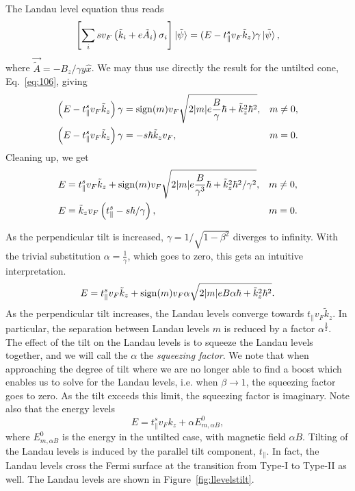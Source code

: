 The Landau level equation thus reads
\begin{equation}
  \label{eq:30}
  \left[
  \sum\limits_{i} s v_{F} \left(\tilde{k}_{i} + e \tilde{A}_{i} \right) \sigma _{i}
\right  ] \ket{\tilde{\psi}} =
(E- t^s_{\parallel} v_{F} \tilde{k}_{z}) \gamma \ket{\tilde{\psi}},
\end{equation}
where \(\vec{\tilde{A}}=-B_{z}/ \gamma y \hat{x}\).
We may thus use directly the result for the untilted cone, Eq.~\eqref{eq:106}, giving
\begin{subequations}
  \label{eq:31}
  \begin{align}
    \left(E - t^s_{\parallel} v_{F} \tilde{k}_{z} \right) \gamma &= \operatorname{sign} (m) v_{F} \sqrt{2 |m| e \frac{B}{ \gamma } \hbar + \tilde{k}_{z}^2 \hbar ^2}, & m \neq 0,\\
    \left(E - t^s_{\parallel} v_{F} \tilde{k}_{z} \right) \gamma &= - s \hbar  \tilde{k}_{z} v_{F}, & m=0.
  \end{align}
\end{subequations}
Cleaning up, we get
\begin{subequations}
  \label{eq:32}
  \begin{align}
    E &= t^s_{\parallel} v_F \tilde{k}_{z} + \operatorname{sign}(m) v_F \sqrt{2 |m| e \frac{B}{\gamma ^3} \hbar + \tilde{k}_{z}^2\hbar ^2 /\gamma ^2}, & m\neq 0,\\
    E &= \tilde{k}_{z} v_{F} \left( t^s_{\parallel}  - s \hbar / \gamma  \right), & m=0.
  \end{align}
\end{subequations}

As the perpendicular tilt is increased, \(\gamma = 1 / \sqrt{1-\beta ^{2}}\) diverges to infinity.
With the trivial substitution \(\alpha = \frac{1}{\gamma }\), which goes to zero, this gets an intuitive interpretation.
\begin{equation}
  \label{eq:33}
  E = t^s_{\parallel} v_{F} \tilde{k}_{z} + \operatorname{sign}(m) v_F \alpha \sqrt{2 |m| e B \alpha \hbar + \tilde{k}_{z}^2\hbar ^2}.
\end{equation}
As the perpendicular tilt increases, the Landau levels converge towards \(t_{\parallel} v_{F} \tilde{k}_{z}\).
In particular, the separation between Landau levels \(m\)  is reduced by a factor \(\alpha ^{\frac{3}{2}}\).
The effect of the tilt on the Landau levels is to squeeze the Landau levels together, and we will call the \(\alpha \) the \emph{squeezing factor}.
We note that when approaching the degree of tilt where we are no longer able to find a boost which enables us to solve for the Landau levels, i.e. when \(\beta \to 1\), the squeezing factor goes to zero.
As the tilt exceeds this limit, the squeezing factor is imaginary.
Note also that the energy levels
\[
E = t^s_{\parallel} v_F k_z + \alpha E^0_{m, \alpha B},
\]
where \( E^0_{m, \alpha B} \) is the energy in the untilted case, with magnetic field \( \alpha B \).
Tilting of the Landau levels is induced by the parallel tilt component, \( t_\parallel \).
In fact, the Landau levels cross the Fermi surface at the transition from Type-I to Type-II as well.
The Landau levels are shown in Figure~\ref{fig:llevelstilt}.


